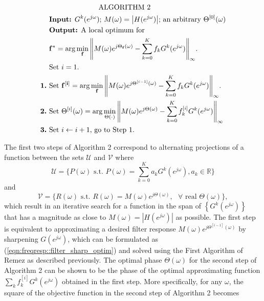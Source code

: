 \documentclass[journal] {IEEEtran}
\begin{document}
\begin{equation*}
\begin{aligned}
&\text{\hspace{1in}ALGORITHM 2} \\
&\text{ \textbf{Input:} $G^k(e^{j\omega})$; $M(\omega)=\left|H(e^{j\omega})\right|$; an arbitrary $\Theta^{[0]}(\omega)$}\\
&\text{ \textbf{Output:} A local optimum for }\\
&\text{ $\mathbf{f^{\ast}} = \arg\min_{\mathbf{f}}\left\|M(\omega)e^{j\Theta_{\mathbf{f}}(\omega)}-\sum_{k=0}^K f_k G^k(e^{j\omega})\right\|_{\infty}$.}\\
&\text{ Set $i=1$.} \\
\text{\bf{1.}}& \text{ Set $\mathbf{f^{[i]}} = \arg\min_{\mathbf{f}}\left\|M(\omega)e^{j\Theta^{[i-1]}(\omega)}-\sum_{k=0}^K f_k G^k(e^{j\omega})\right\|_{\infty}$.}\\
\text{\bf{2.}}& \text{ Set $\Theta^{[i]}(\omega) = \arg\min_{\Theta(\cdot)}\left\|M(\omega)e^{j\Theta(\omega)}-\sum_{k=0}^K f_k^{[i]} G^k(e^{j\omega})\right\|_{\infty}$}\\
\text{\bf{3.}}& \text{ Set $i\leftarrow i+1$, go to Step 1.}\\
\end{aligned}
\end{equation*}

The first two steps of Algorithm 2 correspond to alternating projections of a function between the sets $\mathcal{U}$ and $\mathcal{V}$ where
\begin{equation}\label{eqn:freqresp::U}
\mathcal{U} = \{P(\omega) \mbox{ s.t. } P(\omega)=\sum_{k=0}^K a_k G^k(e^{j\omega}), a_k \in \mathbb{R} \}
\end{equation}
and
\begin{equation}\label{eqn:freqresp::M}
\mathcal{V} = \{R(\omega) \mbox{ s.t. } R(\omega)=M(\omega)e^{j\Theta(\omega)}, \mbox{ $\forall$ real }\Theta(\omega) \},
\end{equation}
which result in an iterative search for a function in the span of $\left\{G^k(e^{j\omega})\right\}$ that has a magnitude as close to $M(\omega)=|H(e^{j\omega})|$ as possible. The first step is equivalent to approximating a desired filter response $M(\omega)e^{j\Theta^{[i-1]}(\omega)}$ by sharpening $G(e^{j\omega})$, which can be formulated as (\ref{eqn:freqresp::filter_sharp_optim}) and solved using the First Algorithm of Remez as described previously. The optimal phase $\Theta(\omega)$ for the second step of Algorithm 2 can be shown to be the phase of the optimal approximating function $\sum_k f_k^{[i]} G^k(e^{j\omega})$ obtained in the first step. More specifically, for any $\omega$, the square of the objective function in the second step of Algorithm 2 becomes
\end{document}
